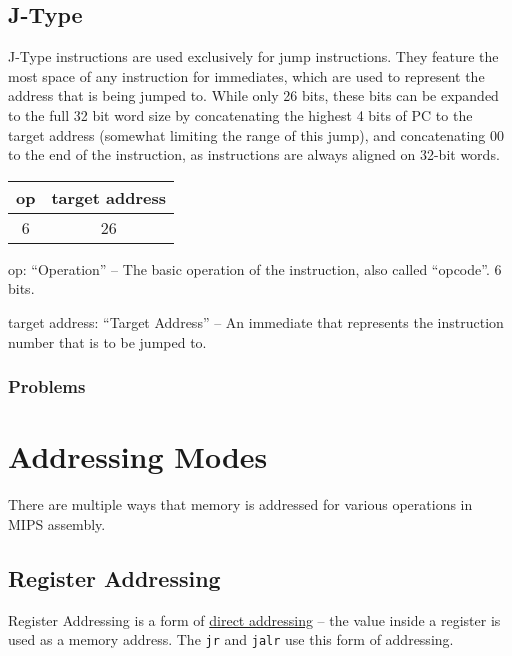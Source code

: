 \documentclass{article}
\begin{document}
\subsection{J-Type}\label{JType}

J-Type instructions are used exclusively for jump instructions. They feature the most space of any instruction for immediates, which are used to represent the address that is being jumped to. While only 26 bits, these bits can be expanded to the full 32 bit word size by concatenating the highest 4 bits of PC to the target address (somewhat limiting the range of this jump), and concatenating 00 to the end of the instruction, as instructions are always aligned on 32-bit words. 

\begin{tabular}{| c | c |}
    \hline
        op & target address \\
        \hline
        6 & 26 \\
    \hline
\end{tabular}

op: ``Operation'' -- The basic operation of the instruction, also called ``opcode''. 6 bits.

target address: ``Target Address'' -- An immediate that represents the instruction number that is to be jumped to. 

\subsubsection{Problems}\label{JTypeProblems}



\section{Addressing Modes}\label{Addressing}

There are multiple ways that memory is addressed for various operations in MIPS assembly. 


\subsection{Register Addressing}\label{Register Addressing}

Register Addressing is a form of \underline{direct addressing} -- the value inside a register is used as a memory address. The \texttt{jr} and \texttt{jalr} use this form of addressing. 
\end{document}
